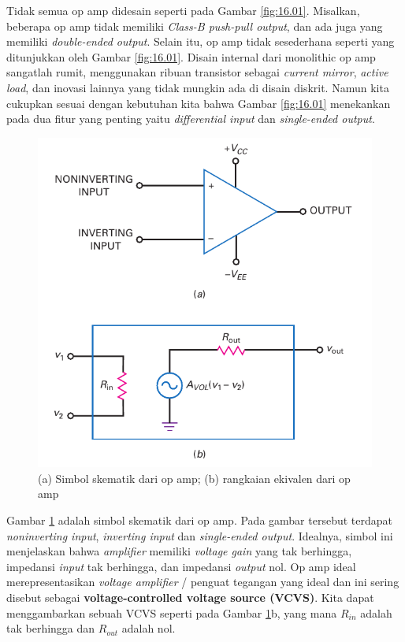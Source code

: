 Tidak semua op amp didesain seperti pada Gambar \ref{fig:16.01}. Misalkan, beberapa op amp tidak memiliki\textit{ Class-B push-pull output}, dan ada juga yang memiliki \textit{double-ended output}. Selain itu, op amp tidak sesederhana seperti yang ditunjukkan oleh Gambar \ref{fig:16.01}. Disain internal dari monolithic op amp sangatlah rumit, menggunakan ribuan transistor sebagai \textit{current mirror}, \textit{active load}, dan inovasi lainnya yang tidak mungkin ada di disain diskrit. Namun kita cukupkan sesuai dengan kebutuhan kita bahwa Gambar \ref{fig:16.01} menekankan pada dua fitur yang penting yaitu \textit{differential input} dan \textit{single-ended output}.

\begin{figure}
	\centering
	\includegraphics[width=0.7\linewidth]{pic/fig:16.02}
	\caption{(a) Simbol skematik dari op amp; (b) rangkaian ekivalen dari op amp}
	\label{fig:16.02}
\end{figure}

Gambar \ref{fig:16.02} adalah simbol skematik dari op amp. Pada gambar tersebut terdapat \textit{noninverting input}, \textit{inverting input} dan \textit{single-ended output}. Idealnya, simbol ini menjelaskan bahwa \textit{amplifier} memiliki \textit{voltage gain} yang tak berhingga, impedansi \textit{input} tak berhingga, dan impedansi \textit{output} nol. Op amp ideal merepresentasikan \textit{voltage amplifier} / penguat tegangan yang ideal dan ini sering disebut sebagai \textbf{voltage-controlled voltage source (VCVS)}. Kita dapat menggambarkan sebuah VCVS seperti pada Gambar \ref{fig:16.02}b, yang mana $ R_{in} $ adalah tak berhingga dan $ R_{out} $ adalah nol.

